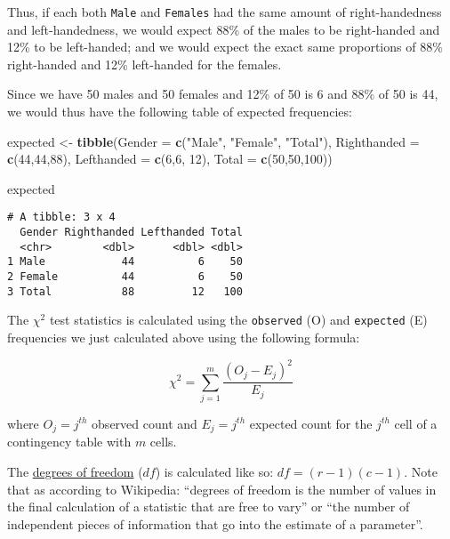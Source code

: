 \documentclass[
]{article}
\newenvironment{Shaded}{\begin{snugshade}}{\end{snugshade}}
\newcommand{\DataTypeTok}[1]{\textcolor[rgb]{0.13,0.29,0.53}{#1}}
\newcommand{\DecValTok}[1]{\textcolor[rgb]{0.00,0.00,0.81}{#1}}
\newcommand{\KeywordTok}[1]{\textcolor[rgb]{0.13,0.29,0.53}{\textbf{#1}}}
\newcommand{\NormalTok}[1]{#1}
\newcommand{\StringTok}[1]{\textcolor[rgb]{0.31,0.60,0.02}{#1}}
\begin{document}
Thus, if each both \texttt{Male} and \texttt{Females} had the same
amount of right-handedness and left-handedness, we would expect 88\% of
the males to be right-handed and 12\% to be left-handed; and we would
expect the exact same proportions of 88\% right-handed and 12\%
left-handed for the females.

Since we have 50 males and 50 females and 12\% of 50 is 6 and 88\% of 50
is 44, we would thus have the following table of expected frequencies:

\begin{Shaded}
\begin{Highlighting}[]
\NormalTok{expected <-}\StringTok{ }\KeywordTok{tibble}\NormalTok{(}\DataTypeTok{Gender =} \KeywordTok{c}\NormalTok{(}\StringTok{"Male"}\NormalTok{, }\StringTok{"Female"}\NormalTok{, }\StringTok{"Total"}\NormalTok{), }
                   \DataTypeTok{Righthanded =} \KeywordTok{c}\NormalTok{(}\DecValTok{44}\NormalTok{,}\DecValTok{44}\NormalTok{,}\DecValTok{88}\NormalTok{), }
                   \DataTypeTok{Lefthanded =} \KeywordTok{c}\NormalTok{(}\DecValTok{6}\NormalTok{,}\DecValTok{6}\NormalTok{, }\DecValTok{12}\NormalTok{), }
                   \DataTypeTok{Total =} \KeywordTok{c}\NormalTok{(}\DecValTok{50}\NormalTok{,}\DecValTok{50}\NormalTok{,}\DecValTok{100}\NormalTok{))}

\NormalTok{expected}
\end{Highlighting}
\end{Shaded}

\begin{verbatim}
# A tibble: 3 x 4
  Gender Righthanded Lefthanded Total
  <chr>        <dbl>      <dbl> <dbl>
1 Male            44          6    50
2 Female          44          6    50
3 Total           88         12   100
\end{verbatim}

The \({\chi}^2\) test statistics is calculated using the
\texttt{observed} (O) and \texttt{expected} (E) frequencies we just
calculated above using the following formula:

\[{\chi}^2=\sum_{j=1}^{m} \frac{(O_j - E_j)^2}{E_j}\]

where \(O_j = j^{th}\) observed count and \(E_j = j^{th}\) expected
count for the \(j^{th}\) cell of a contingency table with \(m\) cells.

The
\href{https://en.wikipedia.org/wiki/Degrees_of_freedom_(statistics)}{degrees
of freedom} (\(df\)) is calculated like so: \(df= (r-1)(c-1)\). Note
that as according to Wikipedia: ``degrees of freedom is the number of
values in the final calculation of a statistic that are free to vary''
or ``the number of independent pieces of information that go into the
estimate of a parameter''.
\end{document}
